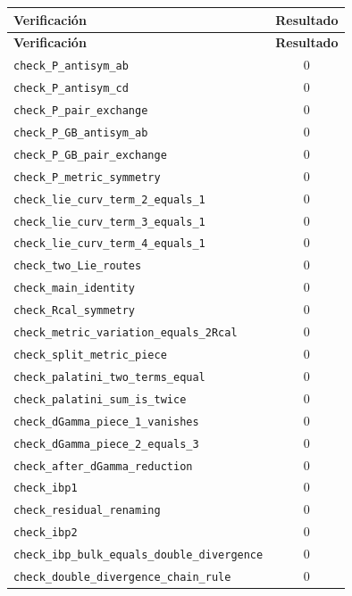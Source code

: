 \documentclass[11pt,a4paper]{article}
\begin{document}
\begin{longtable}{p{}c}
\toprule
\textbf{Verificación} & \textbf{Resultado}\\
\midrule
\endfirsthead
\toprule
\textbf{Verificación} & \textbf{Resultado}\\
\midrule
\endhead
\texttt{check\_P\_antisym\_ab} & $0$\\
\texttt{check\_P\_antisym\_cd} & $0$\\
\texttt{check\_P\_pair\_exchange} & $0$\\
\texttt{check\_P\_GB\_antisym\_ab} & $0$\\
\texttt{check\_P\_GB\_pair\_exchange} & $0$\\
\texttt{check\_P\_metric\_symmetry} & $0$\\
\texttt{check\_lie\_curv\_term\_2\_equals\_1} & $0$\\
\texttt{check\_lie\_curv\_term\_3\_equals\_1} & $0$\\
\texttt{check\_lie\_curv\_term\_4\_equals\_1} & $0$\\
\texttt{check\_two\_Lie\_routes} & $0$\\
\texttt{check\_main\_identity} & $0$\\
\texttt{check\_Rcal\_symmetry} & $0$\\
\texttt{check\_metric\_variation\_equals\_2Rcal} & $0$\\
\texttt{check\_split\_metric\_piece} & $0$\\
\texttt{check\_palatini\_two\_terms\_equal} & $0$\\
\texttt{check\_palatini\_sum\_is\_twice} & $0$\\
\texttt{check\_dGamma\_piece\_1\_vanishes} & $0$\\
\texttt{check\_dGamma\_piece\_2\_equals\_3} & $0$\\
\texttt{check\_after\_dGamma\_reduction} & $0$\\
\texttt{check\_ibp1} & $0$\\
\texttt{check\_residual\_renaming} & $0$\\
\texttt{check\_ibp2} & $0$\\
\texttt{check\_ibp\_bulk\_equals\_double\_divergence} & $0$\\
\texttt{check\_double\_divergence\_chain\_rule} & $0$\\
\bottomrule
\end{longtable}
\end{document}
